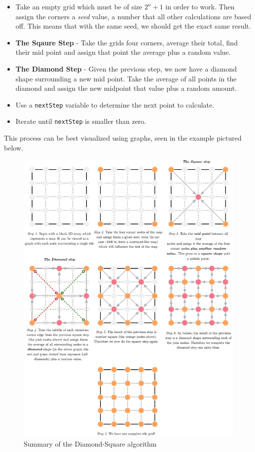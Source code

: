 \documentclass{article}
\begin{document}
\begin{itemize}

	\item
		Take an empty grid which must be of size \(2^{n}+1\) in order to work. Then assign the corners a \emph{seed} value, a number that all other calculations are based off. This means that with the same seed, we should get the exact same result.
	\item
		\textbf{The Sqaure Step} - Take the grids four corners, average their total, find their mid point and assign that point the average plus a random value.
	\item
		\textbf{The Diamond Step} - Given the previous step, we now have a diamond shape surrounding a new mid point. Take the average of all points in the diamond and assign the new midpoint that value plus a random amount.
	\item
		Use a \texttt{nextStep} variable to determine the next point to calculate. 
	\item
		Iterate until \texttt{nextStep} is smaller than zero.
		
\end{itemize}
	
This process can be best visualized using graphs, seen in the example pictured below.
	
\begin{figure}[H]
	\centering
	\includegraphics[width=0.9\linewidth,trim=4 4 4 4,clip]{diamondsquare.eps}
	\renewcommand{\figurename}{Example}
	\caption{Summary of the Diamond-Square algorithm}\label{fig:graph}
\end{figure}
	
\end{document}
